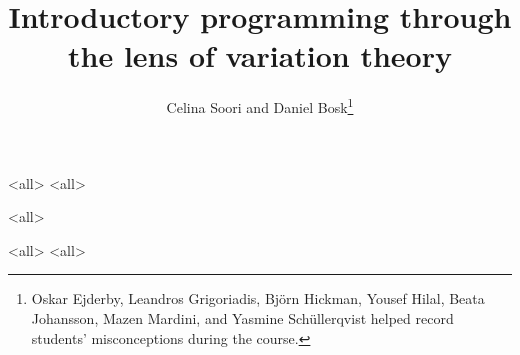 \documentclass[ignoreframetext]{beamer}
\begin{document}

\title{%
  Introductory programming through the lens of variation theory%
}
\author{%
  Celina Soori and
  Daniel Bosk\thanks{%
    Oskar Ejderby,
    Leandros Grigoriadis,
    Björn Hickman,
    Yousef Hilal,
    Beata Johansson,
    Mazen Mardini, and
    Yasmine Schüllerqvist
    helped record students' misconceptions during the course.
  }%
}

\mode*

\begin{frame}
  \maketitle
\end{frame}

\begin{abstract}
  
\end{abstract}

\begin{frame}
  \tableofcontents
\end{frame}

\mode<all>{}
\mode<all>{}



\mode<all>{}

\mode<all>{}
\mode<all>{}








\printbibliography

\appendix
\end{document}
